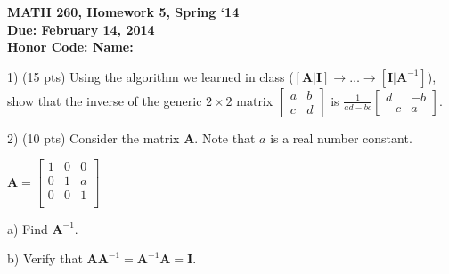\documentclass{article}
\begin{document}
\begin{flushleft}
	\bfseries{MATH 260, Homework 5, Spring `14}\\
	\bfseries{Due: February 14, 2014}\\
	\bfseries{Honor Code:} \hspace{3.5in}\bfseries{Name:}\\
\end{flushleft}
\begin{flushleft}
\vspace{.25in}

1) (15 pts) Using the algorithm we learned in class ($[\textbf{A} | \textbf{I}] \rightarrow \dots \rightarrow [\textbf{I} | \textbf{A}^{-1}]$), show that the inverse of the generic $2 \times 2$ matrix
$\begin{bmatrix}
a & b\\
c & d
\end{bmatrix}$ is
$\frac{1}{ad - bc}\begin{bmatrix}
d & -b\\
-c & a
\end{bmatrix}$.

\pagebreak

2) (10 pts) Consider the matrix $\textbf{A}$.  Note that $a$ is a real number constant. 

\begin{center}
$\textbf{A}=\left[
\begin{array}{rrr}
1  & 0 & 0 \\
0  & 1 & a \\
0  & 0 & 1 \\
\end{array}
\right]$
\end{center}

a) Find $\textbf{A}^{-1}$.

\vspace{3in}

b) Verify that $\textbf{A} \textbf{A}^{-1} = \textbf{A}^{-1} \textbf{A} = \textbf{I}$.


\end{flushleft}
\end{document}
